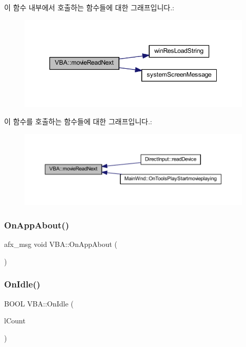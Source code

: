 이 함수 내부에서 호출하는 함수들에 대한 그래프입니다.\+:
\nopagebreak
\begin{figure}[H]
\begin{center}
\leavevmode
\includegraphics[width=345pt]{class_v_b_a_a0f0d982604ac77d23e7fd474c4ebbe2c_cgraph}
\end{center}
\end{figure}
이 함수를 호출하는 함수들에 대한 그래프입니다.\+:
\nopagebreak
\begin{figure}[H]
\begin{center}
\leavevmode
\includegraphics[width=350pt]{class_v_b_a_a0f0d982604ac77d23e7fd474c4ebbe2c_icgraph}
\end{center}
\end{figure}
\mbox{\label{class_v_b_a_a0b2f996850d439b4c61c5f8ab7f5afb1}} 
\subsubsection{\texorpdfstring{On\+App\+About()}{OnAppAbout()}}
{\footnotesize\ttfamily afx\+\_\+msg void V\+B\+A\+::\+On\+App\+About (\begin{DoxyParamCaption}{ }\end{DoxyParamCaption})}

\mbox{\label{class_v_b_a_a0296d1fa6a340dffd47dbe623b64475c}} 
\subsubsection{\texorpdfstring{On\+Idle()}{OnIdle()}}
{\footnotesize\ttfamily B\+O\+OL V\+B\+A\+::\+On\+Idle (\begin{DoxyParamCaption}\item[{L\+O\+NG}]{l\+Count }\end{DoxyParamCaption})\hspace{0.3cm}{\ttfamily [virtual]}}



